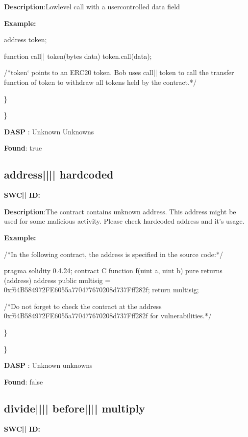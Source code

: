 \documentclass{article}
\begin{document}
\textbf{Description}:Low{\textendash}level call with a user{\textendash}controlled data field


\textbf{Example:} 
\begin{ffcode} 

address token;

function call|\textunderscore| token(bytes data){
  token.call(data);
}

 /*token` points to an ERC20 token. Bob uses call|\textunderscore| token to call the transfer function of token to withdraw all tokens held by the contract.*/ 

\end{ffcode} 
\} 

\} 

\textbf{DASP} : Unknown Unknowns

\textbf{Found}: true

\subsection{address{||\textunderscore|| }hardcoded} 
\textbf{SWC{|\textunderscore| }ID:} 

\textbf{Description}:The contract contains unknown address. This address might be used for some malicious activity. Please check hardcoded address and it's usage.


\textbf{Example:} 
\begin{ffcode} 

/*In the following contract, the address is specified in the source code:*/ 

pragma solidity 0.4.24;
contract C {
  function f(uint a, uint b) pure returns (address) {
    address public multisig = 0xf64B584972FE6055a770477670208d737Fff282f;
    return multisig;
        }
}

 /*Do not forget to check the contract at the address 0xf64B584972FE6055a770477670208d737Fff282f for vulnerabilities.*/ 

\end{ffcode} 
\} 

\} 

\textbf{DASP} : Unknown unknowns

\textbf{Found}: false

\subsection{divide{||\textunderscore|| }before{||\textunderscore|| }multiply} 
\textbf{SWC{|\textunderscore| }ID:} 
\end{document}
